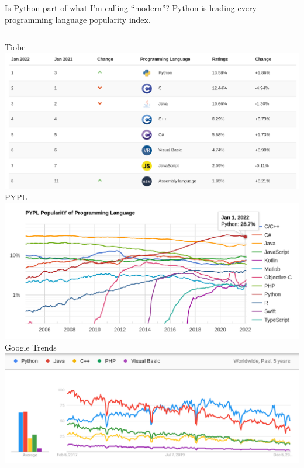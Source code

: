 \documentclass[aspectratio=169]{beamer}
\begin{document}
\begin{frame}{Is Python part of what I'm calling ``modern''?}
\large
\vspace{0.25 cm}
Python is leading every programming language popularity index.
\vspace{0.25 cm}
\begin{columns}[t]
\centering Tiobe
\vspace{0.1 cm}
\includegraphics[width=\linewidth]{PLOTS/python-rankings-tiobe-2022.png}
\centering PYPL
\vspace{0.1 cm}
\includegraphics[width=\linewidth]{PLOTS/python-rankings-pypl-2022.png}
\centering Google Trends
\vspace{0.1 cm}
\includegraphics[width=\linewidth]{PLOTS/python-rankings-googletrends-2022.png}
\end{columns}

\end{frame}
\end{document}
